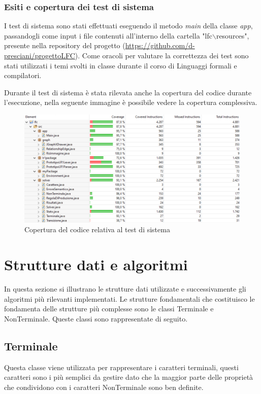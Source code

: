 \documentclass[12pt]{article}
\begin{document}
\subsubsection{Esiti e copertura dei test di sistema}
I test di sistema sono stati effettuati eseguendo il metodo \textit{main} della classe \textit{app}, passandogli come input i file contenuti all'interno della cartella "lfc$\backslash$resources", presente nella repository del progetto (\url{https://github.com/d-presciani/progettoLFC}). Come oracoli per valutare la correttezza dei test sono stati utilizzati i temi svolti in classe durante il corso di Linguaggi formali e compilatori. \par
Durante il test di sistema è stata rilevata anche la copertura del codice durante l'esecuzione, nella seguente immagine è possibile vedere la copertura complessiva.
\begin{figure}[h]
\centering
\includegraphics[width=\textwidth]{immagini/coverage.png}
\caption{Copertura del codice relativa al test di sistema}
\end{figure}
\pagebreak


\section{Strutture dati e algoritmi}
In questa sezione si illustrano le strutture dati utilizzate e successivamente gli algoritmi più rilevanti implementati.
Le strutture fondamentali che costituisco le fondamenta delle strutture più complesse sono le classi Terminale e NonTerminale.
Queste classi sono rappresentate di seguito.
\subsection{Terminale}
Questa classe viene utilizzata per rappresentare i caratteri terminali, questi caratteri sono i più semplici da gestire dato che la maggior parte delle proprietà che condividono con i caratteri NonTerminale sono ben definite.
\end{document}
